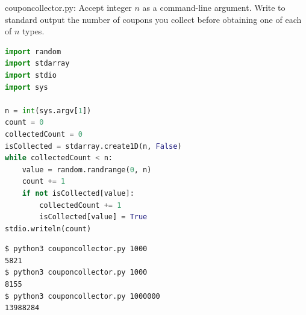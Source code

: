 \documentclass[8pt,a4paper,compress]{beamer}
\begin{document}
\begin{frame}[fragile]
\pause

\begin{framed}
\tiny couponcollector.py: Accept integer $n$ as a command-line argument. Write to standard output the number of coupons you collect before obtaining one of each of $n$ types.
\end{framed}

\begin{lstlisting}[language=Python]
import random
import stdarray
import stdio
import sys

n = int(sys.argv[1])
count = 0
collectedCount = 0
isCollected = stdarray.create1D(n, False)
while collectedCount < n:
    value = random.randrange(0, n)
    count += 1
    if not isCollected[value]:
        collectedCount += 1
        isCollected[value] = True
stdio.writeln(count)
\end{lstlisting}

\pause

\begin{lstlisting}[language={}]
$ python3 couponcollector.py 1000
5821
$ python3 couponcollector.py 1000
8155
$ python3 couponcollector.py 1000000
13988284
\end{lstlisting}
\end{frame}
\end{document}
